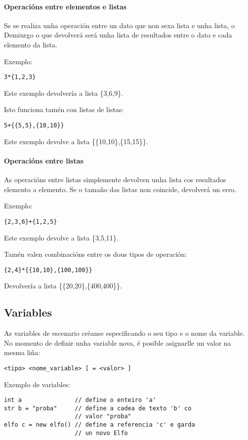 \paragraph{Operacións entre elementos e listas}
Se se realiza unha operación entre un dato que non sexa lista e unha lista, o
Demiurgo o que devolverá será unha lista de resultados entre o dato e cada
elemento da lista.
\par Exemplo:
\begin{lstlisting}
3*{1,2,3}
\end{lstlisting}
\par Este exemplo devolvería a lista \{3,6,9\}.
\par Isto funciona tamén con listas de listas:
\begin{lstlisting}
5+{{5,5},{10,10}}
\end{lstlisting}
\par Este exemplo devolve a lista \{\{10,10\},\{15,15\}\}.
\paragraph{Operacións entre listas}
As operacións entre listas simplemente devolven unha lista cos resultados
elemento a elemento. Se o tamaño das listas non coincide, devolverá un erro.
\par Exemplo:
\begin{lstlisting}
{2,3,6}+{1,2,5}
\end{lstlisting}
\par Este exemplo devolve a lista \{3,5,11\}.
\par Tamén valen combinacións entre os dous tipos de operación:
\begin{lstlisting}
{2,4}*{{10,10},{100,100}}
\end{lstlisting}
\par Devolvería a lista \{\{20,20\},\{400,400\}\}.

\subsection{Variables}
As variables de escenario créanse especificando o seu tipo e o nome da variable.
No momento de definir unha variable nova, é posible asignarlle un valor na mesma
liña:
\begin{lstlisting}
<tipo> <nome_variable> [ = <valor> ]
\end{lstlisting}
\par Exemplo de variables:
\begin{lstlisting}
int a               // define o enteiro 'a'
str b = "proba"     // define a cadea de texto 'b' co
                    // valor "proba"
elfo c = new elfo() // define a referencia 'c' e garda
                    // un novo Elfo 
\end{lstlisting}

